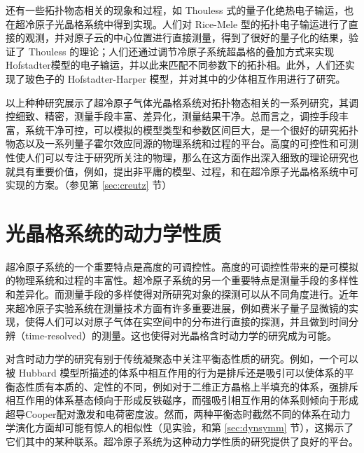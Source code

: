 还有一些拓扑物态相关的现象和过程，如 Thouless 式的量子化绝热电子输运\cite{thouless1983}，也在超冷原子光晶格系统中得到实现\cite{charge-pump-expr-2016-de,charge-pump-expr-2016-jp}。人们对 Rice-Mele 型\cite{ricemele1982}的拓扑电子输运进行了直接的观测\cite{charge-pump-expr-2016-de,charge-pump-expr-2016-jp}，并对原子云的中心位置进行直接测量，得到了很好的量子化的结果，验证了 Thouless 的理论；人们还通过调节冷原子系统超晶格的叠加方式来实现 Hofstadter模型的电子输运\cite{charge-pump-expr-2016-de}，并以此来匹配不同参数下的拓扑相\cite{charge-pump-expr-2016-de}。此外，人们还实现了玻色子的 Hofstadter-Harper 模型\cite{twobody-2017}，并对其中的少体相互作用进行了研究。

以上种种研究展示了超冷原子气体光晶格系统对拓扑物态相关的一系列研究，其调控细致、精密，测量手段丰富、差异化，测量结果干净。总而言之，调控手段丰富，系统干净可控，可以模拟的模型类型和参数区间巨大，是一个很好的研究拓扑物态以及一系列量子霍尔效应同源的物理系统和过程的平台。高度的可控性和可测性使人们可以专注于研究所关注的物理，那么在这方面作出深入细致的理论研究也就具有重要价值，例如，提出非平庸的模型、过程，和在超冷原子光晶格系统中可实现的方案\cite{creutz}。（参见第 \ref{sec:creutz} 节）



\section{光晶格系统的动力学性质}

超冷原子系统的一个重要特点是高度的可调控性。高度的可调控性带来的是可模拟的物理系统和过程的丰富性。超冷原子系统的另一个重要特点是测量手段的多样性和差异化。而测量手段的多样使得对所研究对象的探测可以从不同角度进行。近年来超冷原子实验系统在测量技术方面有许多重要进展，例如费米子量子显微镜\cite{microscope1,microscope2,microscope3,microscope4,microscope5,microscope6}的实现，使得人们可以对原子气体在实空间中的分布进行直接的探测，并且做到时间分辨（time-resolved）的测量。这也使得对光晶格含时动力学的研究成为可能。

对含时动力学的研究有别于传统凝聚态中关注平衡态性质的研究。例如，一个可以被 Hubbard 模型所描述的体系中相互作用的行为是排斥还是吸引可以使体系的平衡态性质有本质的、定性的不同，例如对于二维正方晶格上半填充的体系，强排斥相互作用的体系基态倾向于形成反铁磁序，而强吸引相互作用的体系则倾向于形成超导Cooper配对激发和电荷密度波\cite{nagaosa}。然而，两种平衡态时截然不同的体系在动力学演化方面却可能有惊人的相似性（见实验，和第 \ref{sec:dynsymm} 节），这揭示了它们其中的某种联系。超冷原子系统为这种动力学性质的研究提供了良好的平台。

